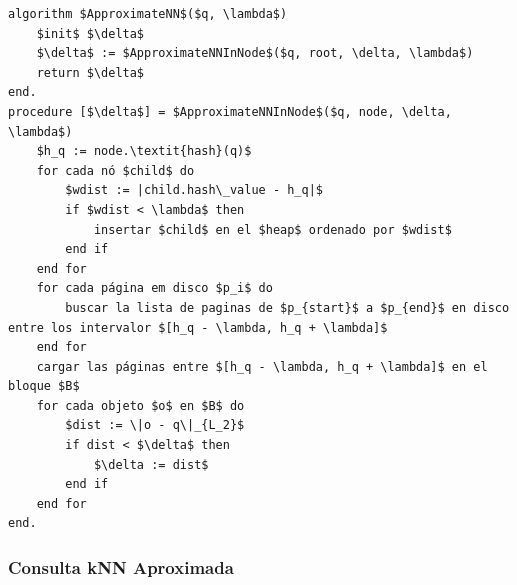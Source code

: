 \newpage
\begin{lstlisting}[mathescape, frame=single, label=alg:HashFile,caption=Consulta kNN aproximada usando HashFile]
algorithm $ApproximateNN$($q, \lambda$)
    $init$ $\delta$
    $\delta$ := $ApproximateNNInNode$($q, root, \delta, \lambda$)
    return $\delta$
end.
procedure [$\delta$] = $ApproximateNNInNode$($q, node, \delta, \lambda$)
    $h_q := node.\textit{hash}(q)$
    for cada nó $child$ do
        $wdist := |child.hash\_value - h_q|$
        if $wdist < \lambda$ then
            insertar $child$ en el $heap$ ordenado por $wdist$
        end if
    end for
    for cada página em disco $p_i$ do
        buscar la lista de paginas de $p_{start}$ a $p_{end}$ en disco entre los intervalor $[h_q - \lambda, h_q + \lambda]$
    end for
    cargar las páginas entre $[h_q - \lambda, h_q + \lambda]$ en el bloque $B$
    for cada objeto $o$ en $B$ do
        $dist := \|o - q\|_{L_2}$
        if dist < $\delta$ then
            $\delta := dist$
        end if
    end for
end.
\end{lstlisting}

\subsubsection{Consulta kNN Aproximada}
 
